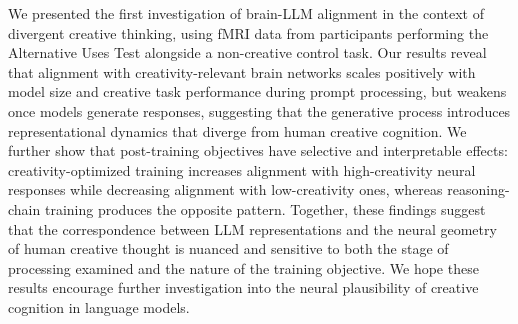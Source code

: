 We presented the first investigation of brain-LLM alignment in the context of divergent creative thinking, using fMRI data from participants performing the Alternative Uses Test alongside a non-creative control task. Our results reveal that alignment with creativity-relevant brain networks scales positively with model size and creative task performance during prompt processing, but weakens once models generate responses, suggesting that the generative process introduces representational dynamics that diverge from human creative cognition. We further show that post-training objectives have selective and interpretable effects: creativity-optimized training increases alignment with high-creativity neural responses while decreasing alignment with low-creativity ones, whereas reasoning-chain training produces the opposite pattern. Together, these findings suggest that the correspondence between LLM representations and the neural geometry of human creative thought is nuanced and sensitive to both the stage of processing examined and the nature of the training objective. We hope these results encourage further investigation into the neural plausibility of creative cognition in language models.